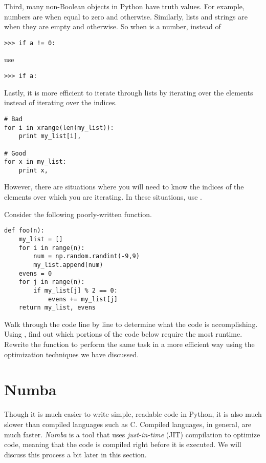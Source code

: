 Third, many non-Boolean objects in Python have truth values.
For example, numbers are  when equal to zero and  otherwise.
Similarly, lists and strings are  when they are empty and  otherwise.
So when  is a number, instead of

\begin{lstlisting}
>>> if a != 0:
\end{lstlisting}
%
use

\begin{lstlisting}
>>> if a:
\end{lstlisting}

Lastly, it is more efficient to iterate through lists by iterating over the elements instead of iterating over the indices.

\begin{lstlisting}
# Bad
for i in xrange(len(my_list)):
    print my_list[i],

# Good
for x in my_list:
    print x,
\end{lstlisting}

However, there are situations where you will need to know the indices of the elements over which you are iterating.
In these situations, use .

\begin{problem}
Consider the following poorly-written function.

\begin{lstlisting}
def foo(n):
    my_list = []
    for i in range(n):
        num = np.random.randint(-9,9)
        my_list.append(num)
    evens = 0
    for j in range(n):
        if my_list[j] % 2 == 0:
            evens += my_list[j]
    return my_list, evens
\end{lstlisting}

Walk through the code line by line to determine what the code is accomplishing.
Using , find out which portions of the code below require the most runtime.
Rewrite the function to perform the same task in a more efficient way using the optimization techniques we have discussed.
\end{problem}

\section*{Numba} %

Though it is much easier to write simple, readable code in Python, it is also much slower than compiled languages such as C.
Compiled languages, in general, are much faster.
\emph{Numba} is a tool that uses \emph{just-in-time} (JIT) compilation to optimize code, meaning that the code is compiled right before it is executed.
We will discuss this process a bit later in this section.

